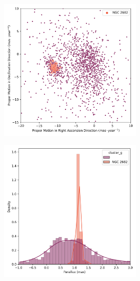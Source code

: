 \documentclass[11pt,a4paper,english,twocolumn]{article}
\begin{document}
\begin{figure}[htbp]
  \centering
  \begin{subfigure}{\columnwidth}
    \centering
    \begin{subfigure}[t]{0.30\textwidth}
      \centering
      \includegraphics[width=\textwidth]{../figures/ngc_2682/pm_ngc_2682.png}
    \end{subfigure}
    \hfill
    \begin{subfigure}[t]{0.30\textwidth}
      \centering
      \includegraphics[width=\textwidth]{../figures/ngc_2682/parallax_ngc_2682.png}

\end{subfigure}
\end{subfigure}
\end{figure}
\end{document}
